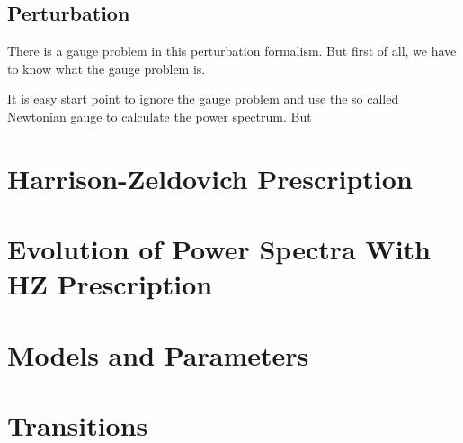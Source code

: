 \documentclass[12pt,a4paper]{book}
\begin{document}
\subsection{Perturbation}

There is a gauge problem in this perturbation formalism. But first of all, we have to know what the gauge problem is.

It is easy start point to ignore the gauge problem and use the so called Newtonian gauge to calculate the power spectrum. But 










\section{Harrison-Zeldovich Prescription}






\section{Evolution of Power Spectra With HZ Prescription}





\section{Models and Parameters}




\section{Transitions}
\end{document}
